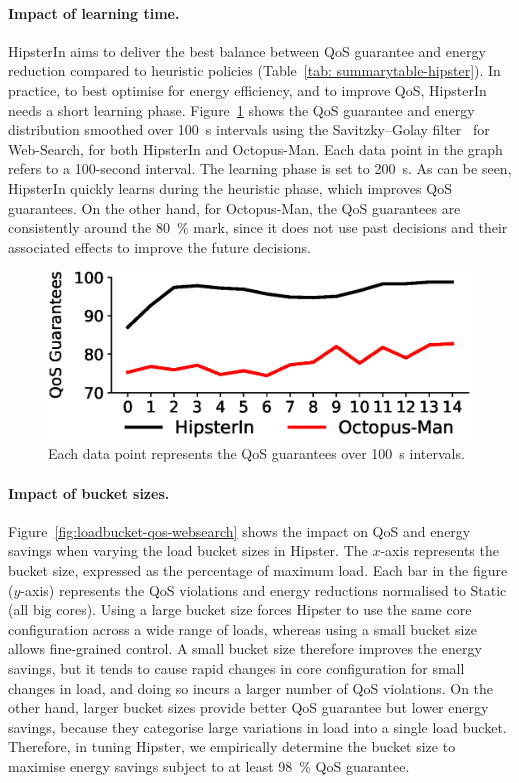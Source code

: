 \paragraph*{Impact of learning time.} HipsterIn aims to deliver the best balance
between QoS guarantee and energy reduction compared to heuristic policies (Table~\ref{tab:
summarytable-hipster}). In practice, to best optimise for energy efficiency, and to improve QoS,
HipsterIn needs a short learning phase. Figure~\ref{fig: learningqos} shows the QoS
guarantee and energy distribution smoothed over \SI{100}{\second} intervals using the
Savitzky--Golay filter~\citep{Krishnan:2013:SOS:2710154.2710696} for Web-Search, for both
HipsterIn and Octopus-Man. Each data point in the graph refers to a 100-second interval.
The learning phase is set to \SI{200}{\second}. As can be seen, HipsterIn quickly learns
during the heuristic phase, which improves QoS guarantees. On the other hand, for
Octopus-Man, the QoS guarantees are consistently around the \SI{80}{\percent} mark, since
it does not use past decisions and their associated effects to improve the future
decisions. 

\begin{figure}[t]
    \centering
    \includegraphics[width=0.8\linewidth]{Chapter4/Figs/learningqos.eps}
    \caption[QoS Guarantees of HipsterIn and Octopus-Man]{ Each data point represents the QoS guarantees over \SI{100}{\second} intervals.}
    \label{fig: learningqos}
\end{figure}

\paragraph*{Impact of bucket sizes.} Figure~\ref{fig:loadbucket-qos-websearch} shows
the impact on QoS and energy savings when varying the load bucket sizes in Hipster. The
$x$-axis represents the bucket size, expressed as the percentage of maximum load. Each bar
in the figure ($y$-axis) represents the QoS violations and energy reductions normalised to
Static (all big cores). Using a large bucket size forces Hipster to use the same core
configuration across a wide range of loads, whereas using a small bucket size allows
fine-grained control. A small bucket size therefore improves the energy savings, but it
tends to cause rapid changes in core configuration for small changes in load, and doing so
incurs a larger number of QoS violations. On the other hand, larger bucket sizes provide
better QoS guarantee but lower energy savings, because they categorise large variations in
load into a single load bucket. Therefore, in tuning Hipster, we empirically determine the
bucket size to maximise energy savings subject to at least \SI{98}{\percent} QoS guarantee.

